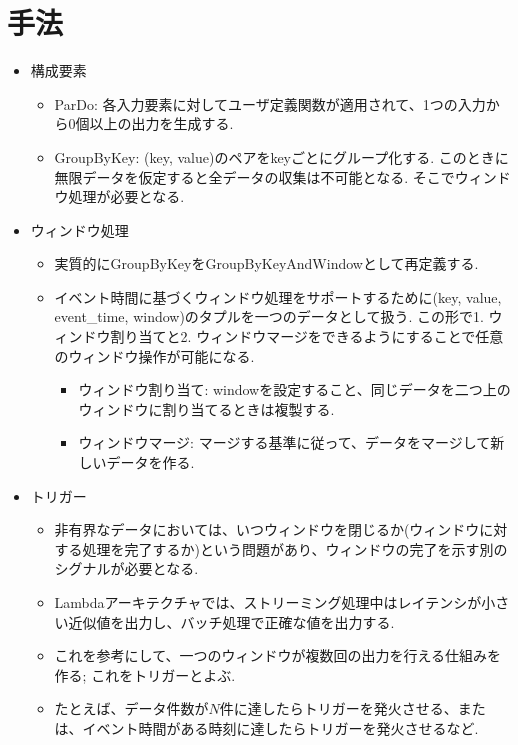 \documentclass[dvipdfmx,uplatex]{jsarticle}
\theoremstyle{remark}
\newenvironment{method}[1]{
    \begin{tcolorbox}[
        colframe=green!50!black,
        colback=green!50!black!10!white,
        colbacktitle=green!50!black!40!white,
        coltitle=black,
        fonttitle=\bfseries,
        title={#1}
    ]
}{
    \end{tcolorbox}
}
\begin{document}
\section{手法}
\begin{method}{Dataflow Model}
\begin{itemize}
    \item 構成要素
    \begin{itemize}
        \item ParDo: 各入力要素に対してユーザ定義関数が適用されて、1つの入力から0個以上の出力を生成する.
        \item GroupByKey: (key, value)のペアをkeyごとにグループ化する. このときに無限データを仮定すると全データの収集は不可能となる. そこでウィンドウ処理が必要となる.
    \end{itemize}
    \item ウィンドウ処理
    \begin{itemize}
        \item 実質的にGroupByKeyをGroupByKeyAndWindowとして再定義する.
        \item イベント時間に基づくウィンドウ処理をサポートするために(key, value, event\_time, window)のタプルを一つのデータとして扱う. この形で1. ウィンドウ割り当てと2. ウィンドウマージをできるようにすることで任意のウィンドウ操作が可能になる.
        \begin{itemize}
            \item ウィンドウ割り当て: windowを設定すること、同じデータを二つ上のウィンドウに割り当てるときは複製する.
            \item ウィンドウマージ: マージする基準に従って、データをマージして新しいデータを作る.
        \end{itemize}
    \end{itemize}
    \item トリガー
    \begin{itemize}
        \item 非有界なデータにおいては、いつウィンドウを閉じるか(ウィンドウに対する処理を完了するか)という問題があり、ウィンドウの完了を示す別のシグナルが必要となる.
        \item Lambdaアーキテクチャでは、ストリーミング処理中はレイテンシが小さい近似値を出力し、バッチ処理で正確な値を出力する.
        \item これを参考にして、一つのウィンドウが複数回の出力を行える仕組みを作る; これをトリガーとよぶ.
        \item たとえば、データ件数が$N$件に達したらトリガーを発火させる、または、イベント時間がある時刻に達したらトリガーを発火させるなど.

\end{itemize}
\end{itemize}
\end{method}
\end{document}
